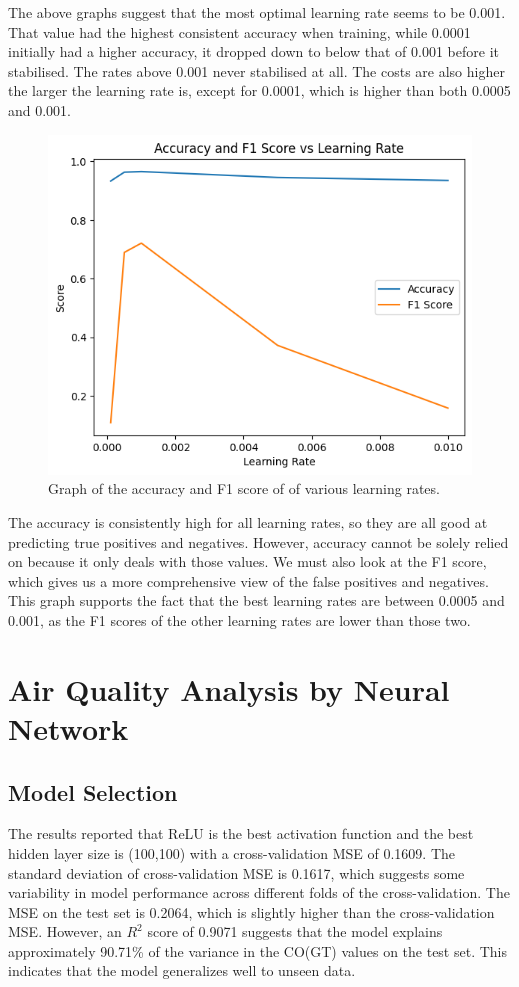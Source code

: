 \documentclass[a4paper]{article}
\begin{document}
The above graphs suggest that the most optimal learning rate seems to be 0.001. That value had the highest consistent accuracy when training, while 0.0001 initially had a higher accuracy, it dropped down to below that of 0.001 before it stabilised. The rates above 0.001 never stabilised at all. The costs are also higher the larger the learning rate is, except for 0.0001, which is higher than both 0.0005 and 0.001.

\newpage
\begin{figure}[htbp]
    \centering
    \includegraphics[width=0.5\linewidth]{1.23.png}
    \caption{\centering Graph of the accuracy and F1 score of of various learning rates.}
\end{figure}

The accuracy is consistently high for all learning rates, so they are all good at predicting true positives and negatives. However, accuracy cannot be solely relied on because it only deals with those values. We must also look at the F1 score, which gives us a more comprehensive view of the false positives and negatives. This graph supports the fact that the best learning rates are between 0.0005 and 0.001, as the F1 scores of the other learning rates are lower than those two.

\newpage
\section{Air Quality Analysis by Neural Network}
\subsection{Model Selection}

The results reported that ReLU is the best activation function and the best hidden layer size is (100,100) with a cross-validation MSE of 0.1609.
The standard deviation of cross-validation MSE is 0.1617, which suggests some variability in model performance across different folds of the cross-validation.
The MSE on the test set is 0.2064, which is slightly higher than the cross-validation MSE. However, an \( R^2 \) score of 0.9071 suggests that the model explains approximately 90.71\% of the variance in the CO(GT) values on the test set. This indicates that the model generalizes well to unseen data.
\end{document}
